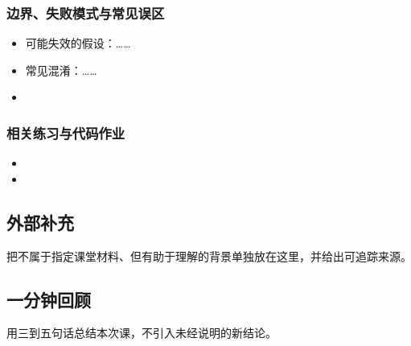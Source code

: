 \subsubsection{边界、失败模式与常见误区}

\begin{itemize}
  \item 可能失效的假设：……
  \item 常见混淆：……
  \item {}
\end{itemize}

\subsubsection{相关练习与代码作业}

\begin{itemize}
  \item {}
  \item {}
\end{itemize}

\subsection{外部补充}

把不属于指定课堂材料、但有助于理解的背景单独放在这里，并给出可追踪来源。

\subsection{一分钟回顾}

用三到五句话总结本次课，不引入未经说明的新结论。
